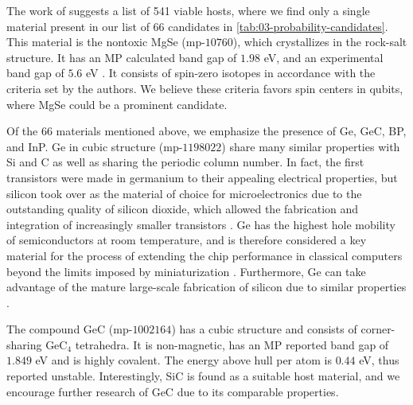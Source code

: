 

The work of \citeauthor{Ferrenti2020} \cite{Ferrenti2020} suggests a list of 541 viable hosts, where we find only a single material present in our list of $66$ candidates in \autoref{tab:03-probability-candidates}. This material is the nontoxic MgSe (mp-$10760$), which crystallizes in the rock-salt structure.
It has an MP calculated band gap of $1.98$ eV, and an experimental band gap of $5.6$ eV \cite{SaumGeorge1959}. It consists of spin-zero isotopes in accordance with the criteria set by the authors. We believe these criteria favors spin centers in qubits, where MgSe could be a prominent candidate.

Of the $66$ materials mentioned above, we emphasize the presence of Ge, GeC, BP, and InP. Ge in cubic structure (mp-$1198022$) share many similar properties with Si and C as well as sharing the periodic column number. In fact, the first transistors were made in germanium to their appealing electrical properties, but silicon took over as the material of choice for microelectronics due to the outstanding quality of silicon dioxide, which allowed the fabrication and integration of increasingly smaller transistors \cite{Scappucci2020, Pillarisetty2011}. Ge has the highest hole mobility of semiconductors at room temperature, and is therefore considered a key material for the process of extending the chip performance in classical computers beyond the limits imposed by miniaturization \cite{Scappucci2020}. Furthermore, Ge can take advantage of the mature large-scale fabrication of silicon due to similar properties \cite{Scappucci2020}.

The compound GeC (mp-$1002164$) has a cubic structure and consists of corner-sharing GeC$_4$ tetrahedra. It is non-magnetic, has an MP reported band gap of $1.849$ eV and is highly covalent. The energy above hull per atom is $0.44$ eV, thus reported unstable. Interestingly, SiC is found as a suitable host material, and we encourage further research of GeC due to its comparable properties.

